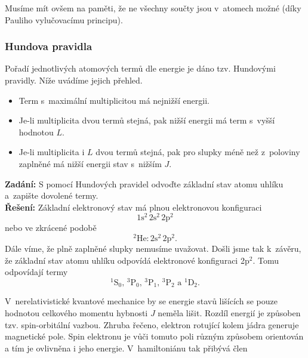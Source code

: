 Musíme mít ovšem na paměti, že ne všechny součty jsou v~atomech možné (díky Pauliho vylučovacímu principu).



\subsubsection{Hundova pravidla}
Pořadí jednotlivých atomových termů dle energie je dáno tzv. Hundovými pravidly. Níže uvádíme jejich přehled.

\begin{itemize}
\item Term s~maximální multiplicitou má nejnižší energii.

\item Je-li multiplicita dvou termů stejná, pak nižší energii má term s~vyšší hodnotou $L$.

\item Je-li multiplicita i $L$ dvou termů stejná, pak pro slupky méně než z~poloviny zaplněné má nižší energii stav s~nižším $J$.  
 
\end{itemize}

\begin{priklad}
\textbf{Zadání:} S pomocí Hundových pravidel odvoďte základní stav atomu uhlíku a~zapište dovolené termy.\\[0.1cm]
\textbf{Řešení:} Základní elektronový stav má plnou elektronovou konfiguraci
\begin{displaymath}
1\mathrm{s}^2 \, 2\mathrm{s}^2 \, 2\mathrm{p}^2
\end{displaymath}
nebo ve zkrácené podobě
\begin{displaymath}
^{2} \mathrm{He}: 2\mathrm{s}^2 \, 2\mathrm{p}^2.
\end{displaymath}
Dále víme, že plně zaplněné slupky nemusíme uvažovat. Došli jsme tak k~závěru, že základní stav atomu uhlíku odpovídá elektronové konfiguraci 2p$^2$. Tomu odpovídají termy
\begin{displaymath}
^{1}\mathrm{S}_0, \, ^{3}\mathrm{P}_0, \, ^{3}\mathrm{P}_1, \, ^{3}\mathrm{P}_2 \mbox{ a } ^{1}\mathrm{D}_2.
\end{displaymath} \vspace{-0.7cm}
\end{priklad}


V~nerelativistické kvantové mechanice by se energie stavů lišících se pouze hodnotou celkového momentu hybnosti $J$ neměla lišit. Rozdíl energií je způsoben tzv. spin-orbitální vazbou. Zhruba řečeno, elektron rotující kolem jádra generuje magnetické pole. Spin elektronu je vůči tomuto poli různým způsobem orientován a tím je ovlivněna i jeho energie. V~hamiltoniánu tak přibývá člen

